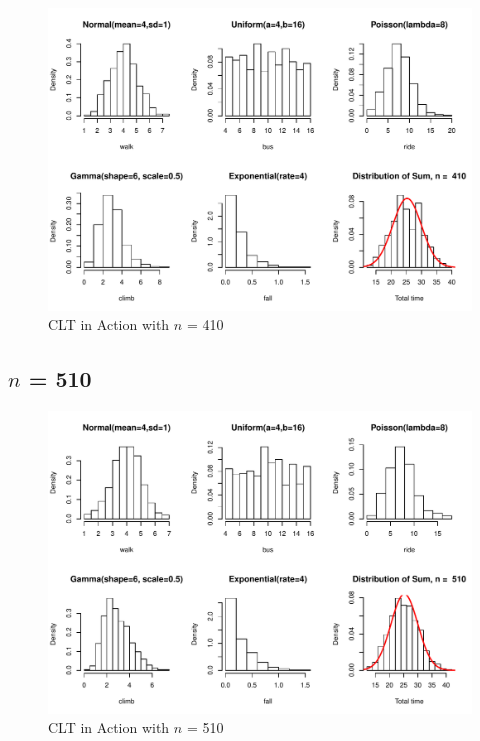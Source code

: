 \documentclass[11pt,letter]{article}\usepackage[]{graphicx}\usepackage[]{color}
\makeatletter
\def\maxwidth{ %
  \ifdim\Gin@nat@width>\linewidth
    \linewidth
  \else
    \Gin@nat@width
  \fi
}
\newenvironment{knitrout}{}{} %
\makeatother
\begin{document}
\begin{knitrout}
\color{fgcolor}\begin{figure}[h]

{\centering \includegraphics[width=\maxwidth]{figure/n-410-1} 

}

\caption[CLT in Action with ]{CLT in Action with $n$ = 410}\label{fig:n-410}
\end{figure}


\end{knitrout}
\newpage
\subsection{$n$ = 510}

\begin{knitrout}
\color{fgcolor}\begin{figure}[h]

{\centering \includegraphics[width=\maxwidth]{figure/n-510-1} 

}

\caption[CLT in Action with ]{CLT in Action with $n$ = 510}\label{fig:n-510}
\end{figure}


\end{knitrout}
\newpage
\end{document}
